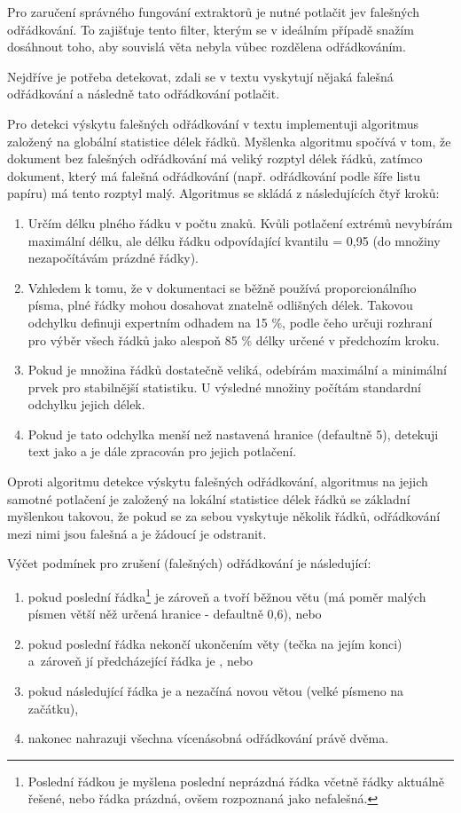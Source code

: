 \documentclass[thesis=M,czech]{FITthesis}[2019/12/23]
\begin{document}
Pro zaručení správného fungování extraktorů je nutné potlačit jev falešných odřádkování. To zajišťuje tento filter, kterým se v ideálním případě snažím dosáhnout toho, aby souvislá věta nebyla vůbec rozdělena odřádkováním.

Nejdříve je potřeba detekovat, zdali se v textu vyskytují nějaká falešná odřádkování a následně tato odřádkování potlačit.

Pro detekci výskytu falešných odřádkování v textu implementuji algoritmus založený na globální statistice délek řádků. Myšlenka algoritmu spočívá v tom, že dokument bez falešných odřádkování má veliký rozptyl délek řádků, zatímco dokument, který má falešná odřádkování (např. odřádkování podle šíře listu papíru) má tento rozptyl malý. Algoritmus se skládá z následujících čtyř kroků:

\begin{enumerate}
    \item Určím délku plného řádku v počtu znaků. Kvůli potlačení extrémů nevybírám maximální délku, ale délku řádku odpovídající kvantilu = 0,95 (do množiny nezapočítávám prázdné řádky).
    \item Vzhledem k tomu, že v dokumentaci se běžně používá proporcionálního písma, plné řádky mohou dosahovat znatelně odlišných délek. Takovou odchylku definuji expertním odhadem na 15 \%, podle čeho určuji rozhraní pro výběr všech  řádků jako alespoň 85 \% délky určené v předchozím kroku.
    \item Pokud je množina  řádků dostatečně veliká, odebírám maximální a minimální prvek pro stabilnější statistiku. U výsledné množiny počítám standardní odchylku jejich délek.
    \item Pokud je tato odchylka menší než nastavená hranice (defaultně 5), detekuji text jako  a je dále zpracován pro jejich potlačení.
\end{enumerate}

Oproti algoritmu detekce výskytu falešných odřádkování, algoritmus na jejich samotné potlačení je založený na lokální statistice délek řádků se základní myšlenkou takovou, že pokud se za sebou vyskytuje několik  řádků, odřádkování mezi nimi jsou falešná a je žádoucí je odstranit.

Výčet podmínek pro zrušení (falešných) odřádkování je následující:
\begin{enumerate}
    \item pokud poslední řádka\footnote{Poslední řádkou je myšlena poslední neprázdná řádka včetně řádky aktuálně řešené, nebo řádka prázdná, ovšem rozpoznaná jako nefalešná.} je zároveň  a tvoří běžnou větu (má poměr malých písmen větší něž určená hranice - defaultně 0,6), nebo
    \item pokud poslední řádka nekončí ukončením věty (tečka na jejím konci) a~zároveň jí předcházející řádka je , nebo
    \item pokud následující řádka je  a nezačíná novou větou (velké písmeno na začátku),
    \item nakonec nahrazuji všechna vícenásobná odřádkování právě dvěma.
\end{enumerate}
\end{document}
